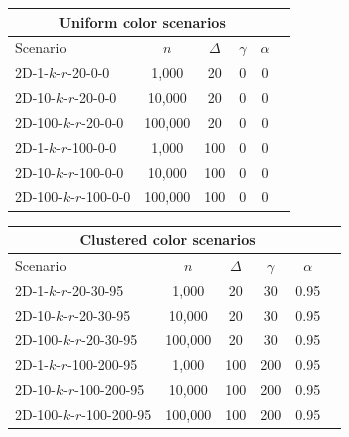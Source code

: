 \documentclass{article}
\begin{document}
\hskip-2.4cm
\begin{tabular}{|l||c|c|c|c|c|}
    \hline
    \multicolumn{5}{|c|}{Uniform color scenarios}                     \\
    \hline
    Scenario               & $n$     & $\Delta$ & $\gamma$ & $\alpha$ \\
    \hline
    2D-1-$k$-$r$-20-0-0    & 1,000   & 20       & 0        & 0        \\
    2D-10-$k$-$r$-20-0-0   & 10,000  & 20       & 0        & 0        \\
    2D-100-$k$-$r$-20-0-0  & 100,000 & 20       & 0        & 0        \\
    2D-1-$k$-$r$-100-0-0   & 1,000   & 100      & 0        & 0        \\
    2D-10-$k$-$r$-100-0-0  & 10,000  & 100      & 0        & 0        \\
    2D-100-$k$-$r$-100-0-0 & 100,000 & 100      & 0        & 0        \\
    \hline
\end{tabular}
\:\:
\begin{tabular}{|l||c|c|c|c|c|}
    \hline
    \multicolumn{5}{|c|}{Clustered color scenarios}                      \\
    \hline
    Scenario                  & $n$     & $\Delta$ & $\gamma$ & $\alpha$ \\
    \hline
    2D-1-$k$-$r$-20-30-95     & 1,000   & 20       & 30       & 0.95     \\
    2D-10-$k$-$r$-20-30-95    & 10,000  & 20       & 30       & 0.95     \\
    2D-100-$k$-$r$-20-30-95   & 100,000 & 20       & 30       & 0.95     \\
    2D-1-$k$-$r$-100-200-95   & 1,000   & 100      & 200      & 0.95     \\
    2D-10-$k$-$r$-100-200-95  & 10,000  & 100      & 200      & 0.95     \\
    2D-100-$k$-$r$-100-200-95 & 100,000 & 100      & 200      & 0.95     \\
    \hline
\end{tabular}\\\\
\end{document}
